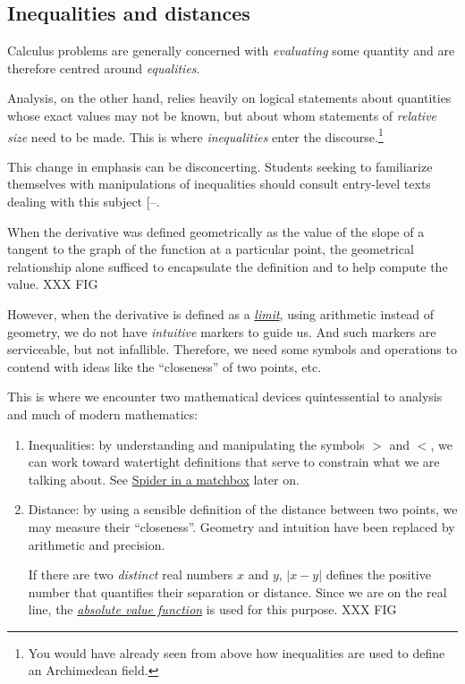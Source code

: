 \documentclass[
  a4paper,
]{article}
\begin{document}
\subsection{Inequalities and
distances}\label{inequalities-and-distances}

Calculus problems are generally concerned with \emph{evaluating} some
quantity and are therefore centred around \emph{equalities}.

Analysis, on the other hand, relies heavily on logical statements about
quantities whose exact values may not be known, but about whom
statements of \emph{relative size} need to be made. This is where
\emph{inequalities} enter the discourse.\footnote{You would have already
  seen from above how inequalities are used to define an Archimedean
  field.}

This change in emphasis can be disconcerting. Students seeking to
familiarize themselves with manipulations of inequalities should consult
entry-level texts dealing with this subject
{[}--\citeproc{ref-alsina-nelsen-2009}{3}{]}.

When the derivative was defined geometrically as the value of the slope
of a tangent to the graph of the function at a particular point, the
geometrical relationship alone sufficed to encapsulate the definition
and to help compute the value. XXX FIG

However, when the derivative is defined as a
\href{https://en.wikipedia.org/wiki/Limit_(mathematics)}{\emph{limit}},
using arithmetic instead of geometry, we do not have \emph{intuitive}
markers to guide us. And such markers are serviceable, but not
infallible. Therefore, we need some symbols and operations to contend
with ideas like the ``closeness'' of two points, etc.

This is where we encounter two mathematical devices quintessential to
analysis and much of modern mathematics:

\begin{enumerate}
\def\labelenumi{\alph{enumi}.}
\item
  Inequalities: by understanding and manipulating the symbols \(>\) and
  \(<\), we can work toward watertight definitions that serve to
  constrain what we are talking about. See \href{}{Spider in a matchbox}
  later on.
\item
  Distance: by using a sensible definition of the distance between two
  points, we may measure their ``closeness''. Geometry and intuition
  have been replaced by arithmetic and precision.

  If there are two \emph{distinct} real numbers \(x\) and \(y\),
  \(|x - y|\) defines the positive number that quantifies their
  separation or distance. Since we are on the real line, the
  \href{https://mathworld.wolfram.com/AbsoluteValue.html}{\emph{absolute
  value function}} is used for this purpose. XXX FIG
\end{enumerate}
\end{document}
